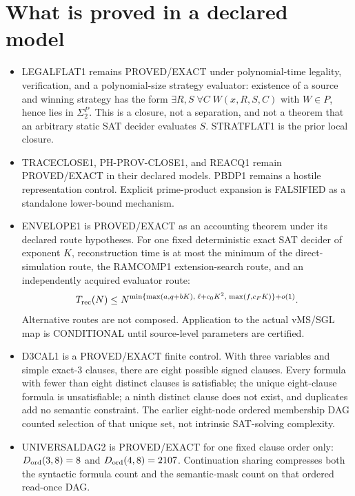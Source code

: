 \documentclass[11pt]{article}
\begin{document}
\section*{What is proved in a declared model}
\begin{itemize}
\item LEGALFLAT1 remains PROVED/EXACT under polynomial-time legality, verification, and a
polynomial-size strategy evaluator: existence of a source and winning strategy has the form
\(\exists R,S\;\forall C\;W(x,R,S,C)\) with \(W\in P\), hence lies in \(\Sigma_2^P\).
This is a closure, not a separation, and not a theorem that an arbitrary static SAT decider
evaluates \(S\). STRATFLAT1 is the prior local closure.
\item TRACECLOSE1, PH-PROV-CLOSE1, and REACQ1 remain PROVED/EXACT in their declared models.
PBDP1 remains a hostile representation control. Explicit prime-product expansion is
FALSIFIED as a standalone lower-bound mechanism.
\item ENVELOPE1 is PROVED/EXACT as an accounting theorem under its declared route
hypotheses. For one fixed deterministic exact SAT decider of exponent \(K\), reconstruction
time is at most the minimum of the direct-simulation route, the RAMCOMP1 extension-search
route, and an independently acquired evaluator route:
\[
T_{\rm rec}(N)\le N^{\min\{\max(a,q+bK),\;\ell+c_0K^2,\;\max(f,c_FK)\}+o(1)}.
\]
Alternative routes are not composed. Application to the actual vMS/SGL map is CONDITIONAL
until source-level parameters are certified.
\item D3CAL1 is a PROVED/EXACT finite control. With three variables and simple exact-3
clauses, there are eight possible signed clauses. Every formula with fewer than eight
distinct clauses is satisfiable; the unique eight-clause formula is unsatisfiable; a ninth
distinct clause does not exist, and duplicates add no semantic constraint. The earlier
eight-node ordered membership DAG counted selection of that unique set, not intrinsic
SAT-solving complexity.
\item UNIVERSALDAG2 is PROVED/EXACT for one fixed clause order only:
\(D_{\rm ord}(3,8)=8\) and \(D_{\rm ord}(4,8)=2107\). Continuation sharing compresses both
the syntactic formula count and the semantic-mask count on that ordered read-once DAG.
\end{itemize}
\end{document}
